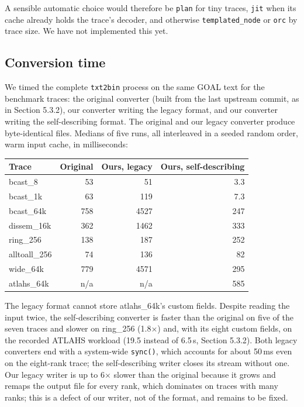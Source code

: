 \documentclass[10pt,a4paper]{article}
\begin{document}
A sensible automatic choice would therefore be \texttt{plan} for tiny traces, \texttt{jit} when its cache already holds the trace's decoder, and otherwise \texttt{templated\_node} or \texttt{orc} by trace size. We have not implemented this yet.

\hypertarget{conversion-time}{}
\subsection{Conversion time}

We timed the complete \texttt{txt2bin} process on the same GOAL text for the benchmark traces: the original converter (built from the last upstream commit, as in Section 5.3.2), our converter writing the legacy format, and our converter writing the self-describing format. The original and our legacy converter produce byte-identical files. Medians of five runs, all interleaved in a seeded random order, warm input cache, in milliseconds:

\begin{center}
\small
\begin{tabular}{lrrr}
\toprule
\textbf{Trace} & \textbf{Original} & \textbf{Ours, legacy} & \textbf{Ours, self-describing} \\
\midrule
bcast\_8 & 53 & 51 & 3.3 \\
bcast\_1k & 63 & 119 & 7.3 \\
bcast\_64k & 758 & 4527 & 247 \\
dissem\_16k & 362 & 1462 & 333 \\
ring\_256 & 138 & 187 & 252 \\
alltoall\_256 & 74 & 136 & 82 \\
wide\_64k & 779 & 4571 & 295 \\
atlahs\_64k & n/a & n/a & 585 \\
\bottomrule
\end{tabular}
\end{center}

The legacy format cannot store atlahs\_64k's custom fields. Despite reading the input twice, the self-describing converter is faster than the original on five of the seven traces and slower on ring\_256 (1.8\(\times\)) and, with its eight custom fields, on the recorded ATLAHS workload (19.5 instead of 6.5\,s, Section 5.3.2). Both legacy converters end with a system-wide \texttt{sync()}, which accounts for about 50\,ms even on the eight-rank trace; the self-describing writer closes its stream without one. Our legacy writer is up to 6\(\times\) slower than the original because it grows and remaps the output file for every rank, which dominates on traces with many ranks; this is a defect of our writer, not of the format, and remains to be fixed.
\end{document}
